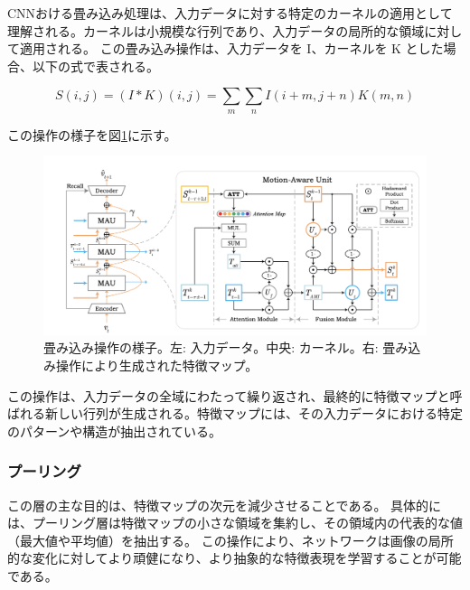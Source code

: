         CNNおける畳み込み処理は、入力データに対する特定のカーネルの適用として理解される。カーネルは小規模な行列であり、入力データの局所的な領域に対して適用される。
        この畳み込み操作は、入力データを I、カーネルを K とした場合、以下の式で表される。

        \begin{equation}
          S(i, j) = (I * K)(i, j) = \sum_{m}\sum_{n}I(i+m, j+n)K(m, n)
        \end{equation}
        
        この操作の様子を図\ref{fig:convolution}に示す。
        \begin{figure}[h]
          \centering
          \includegraphics[width=\textwidth]{figures/mau.png}
          \caption{畳み込み操作の様子。左: 入力データ。中央: カーネル。右: 畳み込み操作により生成された特徴マップ。}
          \label{fig:convolution}
        \end{figure}

        この操作は、入力データの全域にわたって繰り返され、最終的に特徴マップと呼ばれる新しい行列が生成される。特徴マップには、その入力データにおける特定のパターンや構造が抽出されている。
      
      \subsubsection{プーリング}
        この層の主な目的は、特徴マップの次元を減少させることである。
        具体的には、プーリング層は特徴マップの小さな領域を集約し、その領域内の代表的な値（最大値や平均値）を抽出する。
        この操作により、ネットワークは画像の局所的な変化に対してより頑健になり、より抽象的な特徴表現を学習することが可能である。

